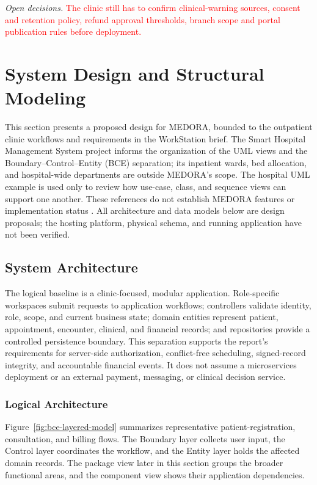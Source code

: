 \documentclass[a4paper,12pt]{article}
\newcommand{\weak}[1]{\textcolor{red}{#1}}
\begin{document}
\textit{Open decisions.} \weak{The clinic still has to confirm clinical-warning sources, consent and retention policy, refund approval thresholds, branch scope and portal publication rules before deployment.}


\section{System Design and Structural Modeling}

This section presents a proposed design for MEDORA, bounded to the outpatient clinic workflows and requirements in the WorkStation brief. The Smart Hospital Management System project informs the organization of the UML views and the Boundary--Control--Entity (BCE) separation; its inpatient wards, bed allocation, and hospital-wide departments are outside MEDORA's scope. The hospital UML example is used only to review how use-case, class, and sequence views can support one another. These references do not establish MEDORA features or implementation status \citep{Saipraveen2026SmartHospital,SoftwareIdeas2024HospitalUML}. All architecture and data models below are design proposals; the hosting platform, physical schema, and running application have not been verified.

\subsection{System Architecture}

The logical baseline is a clinic-focused, modular application. Role-specific workspaces submit requests to application workflows; controllers validate identity, role, scope, and current business state; domain entities represent patient, appointment, encounter, clinical, and financial records; and repositories provide a controlled persistence boundary. This separation supports the report's requirements for server-side authorization, conflict-free scheduling, signed-record integrity, and accountable financial events. It does not assume a microservices deployment or an external payment, messaging, or clinical decision service.

\subsubsection{Logical Architecture}

Figure~\ref{fig:bce-layered-model} summarizes representative patient-registration, consultation, and billing flows. The Boundary layer collects user input, the Control layer coordinates the workflow, and the Entity layer holds the affected domain records. The package view later in this section groups the broader functional areas, and the component view shows their application dependencies.
\end{document}
